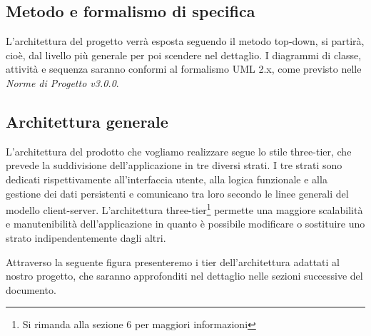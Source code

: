 \subsection{Metodo e formalismo di specifica}
L'architettura del progetto verrà esposta seguendo il metodo \gls{top-down}, si partirà, cioè, dal livello più generale per poi scendere nel dettaglio. I diagrammi di classe, attività e sequenza saranno conformi al formalismo \gls{UML} 2.x, come previsto nelle \textit{Norme di Progetto v3.0.0}.

\subsection{Architettura generale}
L'architettura del prodotto che vogliamo realizzare segue lo stile three-tier, che prevede la suddivisione dell'applicazione in tre diversi strati. I tre strati sono dedicati rispettivamente all'interfaccia utente, alla logica funzionale e alla gestione dei dati persistenti e comunicano tra loro secondo le linee generali del modello client-server. L'architettura three-tier\footnote{Si rimanda alla sezione 6 per maggiori informazioni} permette una maggiore scalabilità e manutenibilità dell'applicazione in quanto è possibile modificare o sostituire uno strato indipendentemente dagli altri.

Attraverso la seguente figura presenteremo i tier dell'architettura adattati al nostro progetto, che saranno approfonditi nel dettaglio nelle sezioni successive del documento.

